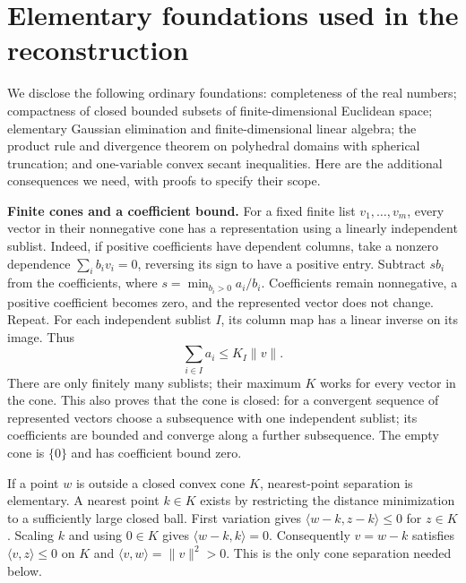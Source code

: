 \documentclass[
  11pt,
]{article}
\begin{document}
\section{Elementary foundations used in the
reconstruction}\label{elementary-foundations-used-in-the-reconstruction}

We disclose the following ordinary foundations: completeness of the real
numbers; compactness of closed bounded subsets of finite-dimensional
Euclidean space; elementary Gaussian elimination and finite-dimensional
linear algebra; the product rule and divergence theorem on polyhedral
domains with spherical truncation; and one-variable convex secant
inequalities. Here are the additional consequences we need, with proofs
to specify their scope.

\textbf{Finite cones and a coefficient bound.} For a fixed finite list
\(v_1,\ldots,v_m\), every vector in their nonnegative cone has a
representation using a linearly independent sublist. Indeed, if positive
coefficients have dependent columns, take a nonzero dependence
\(\sum_i b_i v_i=0\), reversing its sign to have a positive entry.
Subtract \(s b_i\) from the coefficients, where
\(s=\min_{b_i>0} a_i/b_i\). Coefficients remain nonnegative, a positive
coefficient becomes zero, and the represented vector does not change.
Repeat. For each independent sublist \(I\), its column map has a linear
inverse on its image. Thus \[ \sum_{i\in I} a_i\leq K_I\|v\|. \] There
are only finitely many sublists; their maximum \(K\) works for every
vector in the cone. This also proves that the cone is closed: for a
convergent sequence of represented vectors choose a subsequence with one
independent sublist; its coefficients are bounded and converge along a
further subsequence. The empty cone is \(\{0\}\) and has coefficient
bound zero.

If a point \(w\) is outside a closed convex cone \(K\), nearest-point
separation is elementary. A nearest point \(k\in K\) exists by
restricting the distance minimization to a sufficiently large closed
ball. First variation gives \(\langle w-k,z-k\rangle\leq0\) for
\(z\in K\). Scaling \(k\) and using \(0\in K\) gives
\(\langle w-k,k\rangle=0\). Consequently \(v=w-k\) satisfies
\(\langle v,z\rangle\leq0\) on \(K\) and
\(\langle v,w\rangle=\|v\|^2>0\). This is the only cone separation
needed below.
\end{document}
